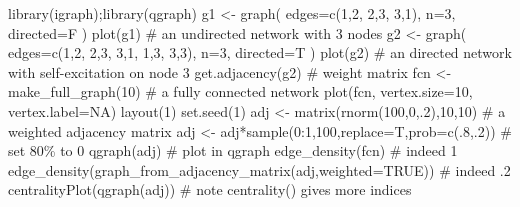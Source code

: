 \documentclass[
  a4paper,
  DIV=11,
  numbers=noendperiod,
  oneside]{scrreprt}
\newenvironment{Shaded}{\begin{snugshade}}{\end{snugshade}}
\newcommand{\AttributeTok}[1]{\textcolor[rgb]{0.40,0.45,0.13}{#1}}
\newcommand{\CommentTok}[1]{\textcolor[rgb]{0.37,0.37,0.37}{#1}}
\newcommand{\ConstantTok}[1]{\textcolor[rgb]{0.56,0.35,0.01}{#1}}
\newcommand{\DecValTok}[1]{\textcolor[rgb]{0.68,0.00,0.00}{#1}}
\newcommand{\FunctionTok}[1]{\textcolor[rgb]{0.28,0.35,0.67}{#1}}
\newcommand{\NormalTok}[1]{\textcolor[rgb]{0.00,0.23,0.31}{#1}}
\newcommand{\OtherTok}[1]{\textcolor[rgb]{0.00,0.23,0.31}{#1}}
\newcommand{\SpecialCharTok}[1]{\textcolor[rgb]{0.37,0.37,0.37}{#1}}
\begin{document}
\begin{Shaded}
\begin{Highlighting}[]
\FunctionTok{library}\NormalTok{(igraph);}\FunctionTok{library}\NormalTok{(qgraph)}
\NormalTok{g1 }\OtherTok{\textless{}{-}} \FunctionTok{graph}\NormalTok{( }\AttributeTok{edges=}\FunctionTok{c}\NormalTok{(}\DecValTok{1}\NormalTok{,}\DecValTok{2}\NormalTok{, }\DecValTok{2}\NormalTok{,}\DecValTok{3}\NormalTok{, }\DecValTok{3}\NormalTok{,}\DecValTok{1}\NormalTok{), }\AttributeTok{n=}\DecValTok{3}\NormalTok{, }\AttributeTok{directed=}\NormalTok{F ) }
\FunctionTok{plot}\NormalTok{(g1) }\CommentTok{\# an undirected network with 3 nodes}
\NormalTok{g2 }\OtherTok{\textless{}{-}} \FunctionTok{graph}\NormalTok{( }\AttributeTok{edges=}\FunctionTok{c}\NormalTok{(}\DecValTok{1}\NormalTok{,}\DecValTok{2}\NormalTok{, }\DecValTok{2}\NormalTok{,}\DecValTok{3}\NormalTok{, }\DecValTok{3}\NormalTok{,}\DecValTok{1}\NormalTok{, }\DecValTok{1}\NormalTok{,}\DecValTok{3}\NormalTok{, }\DecValTok{3}\NormalTok{,}\DecValTok{3}\NormalTok{), }\AttributeTok{n=}\DecValTok{3}\NormalTok{, }\AttributeTok{directed=}\NormalTok{T ) }
\FunctionTok{plot}\NormalTok{(g2) }\CommentTok{\# an directed network with self{-}excitation on node 3}
\FunctionTok{get.adjacency}\NormalTok{(g2) }\CommentTok{\# weight matrix}
\NormalTok{fcn }\OtherTok{\textless{}{-}} \FunctionTok{make\_full\_graph}\NormalTok{(}\DecValTok{10}\NormalTok{) }\CommentTok{\# a fully connected network}
\FunctionTok{plot}\NormalTok{(fcn, }\AttributeTok{vertex.size=}\DecValTok{10}\NormalTok{, }\AttributeTok{vertex.label=}\ConstantTok{NA}\NormalTok{)}
\FunctionTok{layout}\NormalTok{(}\DecValTok{1}\NormalTok{)}
\FunctionTok{set.seed}\NormalTok{(}\DecValTok{1}\NormalTok{)}
\NormalTok{adj }\OtherTok{\textless{}{-}} \FunctionTok{matrix}\NormalTok{(}\FunctionTok{rnorm}\NormalTok{(}\DecValTok{100}\NormalTok{,}\DecValTok{0}\NormalTok{,.}\DecValTok{2}\NormalTok{),}\DecValTok{10}\NormalTok{,}\DecValTok{10}\NormalTok{) }\CommentTok{\# a weighted adjacency matrix}
\NormalTok{adj }\OtherTok{\textless{}{-}}\NormalTok{ adj}\SpecialCharTok{*}\FunctionTok{sample}\NormalTok{(}\DecValTok{0}\SpecialCharTok{:}\DecValTok{1}\NormalTok{,}\DecValTok{100}\NormalTok{,}\AttributeTok{replace=}\NormalTok{T,}\AttributeTok{prob=}\FunctionTok{c}\NormalTok{(.}\DecValTok{8}\NormalTok{,.}\DecValTok{2}\NormalTok{)) }\CommentTok{\# set 80\% to 0}
\FunctionTok{qgraph}\NormalTok{(adj) }\CommentTok{\# plot in qgraph}
\FunctionTok{edge\_density}\NormalTok{(fcn) }\CommentTok{\# indeed 1}
\FunctionTok{edge\_density}\NormalTok{(}\FunctionTok{graph\_from\_adjacency\_matrix}\NormalTok{(adj,}\AttributeTok{weighted=}\ConstantTok{TRUE}\NormalTok{)) }\CommentTok{\# indeed .2}
\FunctionTok{centralityPlot}\NormalTok{(}\FunctionTok{qgraph}\NormalTok{(adj)) }\CommentTok{\# note centrality() gives more indices}
\end{Highlighting}
\end{Shaded}
\end{document}
